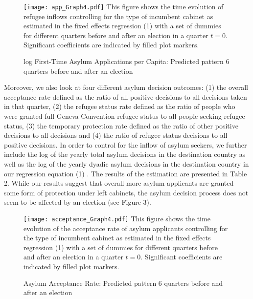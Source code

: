 \documentclass[a4paper,12pt]{article}
\begin{document}
\begin{figure}
	\centering
    \caption{log First-Time Asylum Applications per Capita: Predicted pattern 6 quarters before and after an election}
	\texttt{[image: app\_Graph4.pdf]}
	      {\footnotesize This figure shows the time evolution of refugee inflows controlling for the type of incumbent cabinet as estimated in the fixed effects regression (1) with a set of dummies for different quarters before and after an election in a quarter $t=0$. Significant coefficients are indicated by filled plot markers. }\\
\label{Figure2}
\end{figure}

Moreover, we also look at four different asylum decision outcomes: (1) the overall acceptance rate defined as the ratio of all positive decisions to all decisions taken in that quarter, (2) the refugee status rate defined as the ratio of people who were granted full Geneva Convention refugee status to all people seeking refugee status, (3) the temporary protection rate defined as the ratio of other positive decisions to all decisions and (4) the ratio of refugee status decisions to all positive decisions. In order to control for the inflow of asylum seekers, we further include  the log of the yearly total asylum decisions in the destination country as well as the log of  the yearly dyadic asylum decisions in the destination country in our regression equation (1) . The results of the estimation are presented in Table 2.  While our results suggest that overall more asylum applicants are granted some form of protection under left cabinets,  the asylum decision process does not seem to be affected by an election (see Figure 3).  

\begin{figure}
	\centering
    	\caption{Asylum Acceptance Rate: Predicted pattern 6 quarters before and after an election}
	\texttt{[image: acceptance\_Graph4.pdf]}
       {\footnotesize This figure shows the time evolution of the acceptance rate of asylum applicants controlling for the type of incumbent cabinet as estimated in the fixed effects regression (1) with a set of dummies for different quarters before and after an election in a quarter $t=0$. Significant coefficients are indicated by filled plot markers. }\\
\label{Figure3}
\end{figure}
\end{document}

